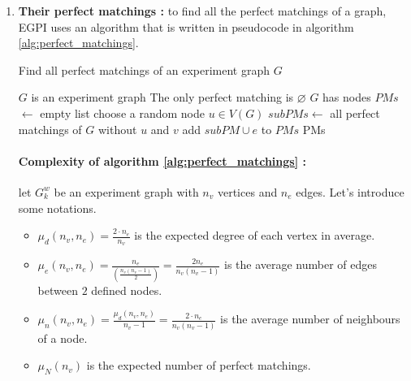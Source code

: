 \begin{enumerate}
    \item \textbf{Their perfect matchings :} to find all the perfect matchings of a graph, EGPI uses an algorithm that is written in pseudocode in algorithm \ref{alg:perfect_matchings}.

    \begin{algorithm}[H]
        \caption{Find all perfect matchings of an experiment graph $G$}
        \label{alg:perfect_matchings}
        \begin{algorithmic}
            \Require $G$ is an experiment graph
                \State The only perfect matching is $\varnothing$
            \ElsIf
                    {$G$ has nodes}
                \State $PMs$ $\gets$ empty list
                \State choose a random node $u \in V(G)$
                    \State $subPMs \gets$ all perfect matchings of $G$ without $u$ and $v$
                            \State add $subPM \cup e$ to $PMs$
                        \EndFor
                    \EndFor
                \EndFor
            \EndIf
            \State \Return PMs
        \end{algorithmic}
    \end{algorithm}

    \paragraph{Complexity of algorithm \ref{alg:perfect_matchings} :} let $G_k^w$ be an experiment graph with $n_v$ vertices and $n_e$ edges. Let's introduce some notations.

    \begin{itemize}
        \item $\mu_d(n_v, n_e) = \frac{2 \cdot n_e}{n_v}$ is the expected degree of each vertex in average.
        \item $\mu_e(n_v, n_e) = \frac{n_e}{\left(\frac{n_v(n_v-1)}{2}\right)} = \frac{2n_e}{n_v(n_v-1)}$ is the average number of edges between $2$ defined nodes.
        \item $\mu_n(n_v, n_e) = \frac{\mu_d(n_v, n_e)}{n_v-1} = \frac{2 \cdot n_e}{n_v(n_v-1)}$ is the average number of neighbours of a node.
        \item $\mu_N(n_v)$ is the expected number of perfect matchings.
    \end{itemize}


\end{enumerate}
